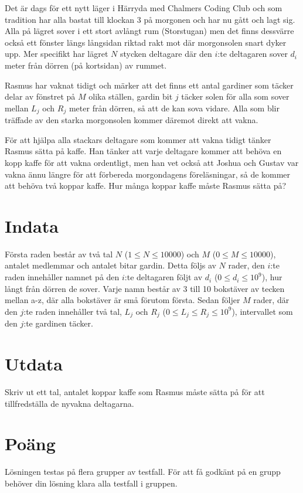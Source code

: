 
Det är dags för ett nytt läger i Härryda med Chalmers Coding Club och som tradition har alla bastat till klockan 3 på
morgonen och har nu gått och lagt sig. Alla på lägret sover i ett stort avlångt rum (Storstugan) men det finns dessvärre
också ett fönster längs långsidan riktad rakt mot där morgonsolen snart dyker upp. Mer specifikt har lägret $N$ stycken
deltagare där den $i$:te deltagaren sover $d_i$ meter från dörren (på kortsidan) av rummet.

Rasmus har vaknat tidigt och märker att det finns ett antal gardiner som täcker delar av fönstret på $M$ olika ställen,
gardin bit $j$ täcker solen för alla som sover mellan $L_j$ och $R_j$ meter från dörren, så att de kan sova vidare. Alla
som blir träffade av den starka morgonsolen kommer däremot direkt att vakna.

För att hjälpa alla stackars deltagare som kommer att vakna tidigt tänker Rasmus sätta på kaffe. Han tänker att varje
deltagare kommer att behöva en kopp kaffe för att vakna ordentligt, men han vet också att Joshua och Gustav
var vakna ännu längre för att förbereda morgondagens föreläsningar, så de kommer att behöva två koppar kaffe. Hur
många koppar kaffe måste Rasmus sätta på?


\section*{Indata}
Första raden består av två tal $N$ ($1 \le N \le 10000$) och $M$ ($0 \le M \le 10000$), antalet medlemmar och antalet bitar gardin. Detta följs
av $N$ rader, den $i$:te raden innehåller namnet på den $i$:te deltagaren följt av $d_i$ ($0 \le d_i \le 10^9$), hur långt
från dörren de sover. Varje namn består av 3 till 10 bokstäver av tecken mellan a-z, där alla bokstäver är små förutom första.
Sedan följer $M$ rader, där den $j$:te raden innehåller två tal, $L_j$ och $R_j$ ($0 \le L_j \le R_j \le 10^9$),
intervallet som den $j$:te gardinen täcker.

\section*{Utdata}
Skriv ut ett tal, antalet koppar kaffe som Rasmus måste sätta på för att tillfredställa de nyvakna deltagarna.

\section*{Poäng}
Lösningen testas på flera grupper av testfall. För att få godkänt på en grupp behöver din lösning
klara alla testfall i gruppen.

